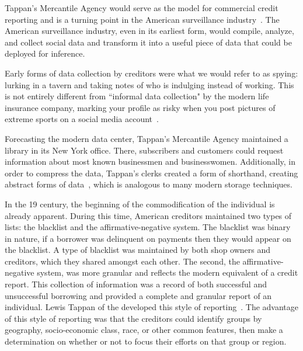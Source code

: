 Tappan's Mercantile Agency would serve as the model for commercial
credit reporting and is a turning point in the American surveillance
industry~\cite{lauer2017creditworthy}. The American surveillance industry,
even in its earliest form, would compile, analyze, and collect social data and
transform it into a useful piece of data that could be deployed for inference.

Early forms of data collection by creditors were what we would refer to as
spying: lurking in a tavern and taking notes of who is indulging instead of
working. This is not entirely different from ``informal data collection" by the
modern life insurance company, marking your profile as risky when you post pictures
of extreme sports on a social media account~\cite{naic2012}.

Forecasting the modern data center, Tappan's Mercantile Agency
maintained a library in its New York office. There, subscribers and customers
could request information about most known businessmen and businesswomen.
Additionally, in order to compress the data, Tappan's clerks created a form of
shorthand, creating abstract forms of data~\cite{lauer2017creditworthy}, which
is analogous to many modern storage techniques.


In the 19 century, the beginning of the commodification of the %
individual is already apparent. During this time, American creditors maintained
two types of lists: the blacklist and the affirmative-negative system. The
blacklist was binary in nature, if a borrower was delinquent on payments then
they would appear on the blacklist. A type of blacklist was maintained by both shop
owners and creditors, which they shared amongst each other. The second, the
affirmative-negative system, was more granular and reflects the modern
equivalent of a credit report. This collection of information was a record of
both successful and unsuccessful borrowing and provided a complete and granular
report of an individual. Lewis Tappan of the \mca developed this style of
reporting~\cite{lauer2017creditworthy}. The advantage of this style of
reporting was that the creditors could identify groups by geography,
socio-economic class, race, or other common features, then make a determination
on whether or not to focus their efforts on that group or region.

